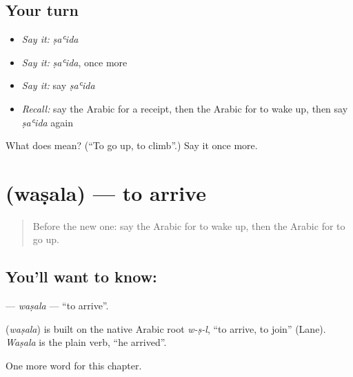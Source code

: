 \subsection*{Your turn}
\begin{itemize}
\raggedright
  \item \emph{Say it:} \emph{ṣaʿida}
  \item \emph{Say it:} \emph{ṣaʿida}, once more
  \item \emph{Say it:} say \emph{ṣaʿida}
  \item \emph{Recall:} say the Arabic for a receipt, then the Arabic for to wake up, then say \emph{ṣaʿida} again
\end{itemize}

\begin{tcolorbox}[breakable,colback=teal!4,colframe=teal!35!black,title={Before you move on}]
What does  mean? (\textquotedblleft{}To go up, to climb\textquotedblright{}.) Say it once more.
\end{tcolorbox}
\section[\texorpdfstring{\ar{وصل} (waṣala)}{وصل (waṣala)}]{ (waṣala) — to arrive}

\label{lesson:AR-C159-wasala}



\begin{quote}
Before the new one: say the Arabic for to wake up, then the Arabic for to go up.
\end{quote}

\subsection*{You'll want to know: }
\textbf{} — \emph{waṣala} — \textquotedblleft{}to arrive\textquotedblright{}.

\begin{cousinweb}
\textbf{} (\emph{waṣala}) is built on the native Arabic root \emph{w-ṣ-l}, \textquotedblleft{}to arrive, to join\textquotedblright{} (Lane). \emph{Waṣala} is the plain verb, \textquotedblleft{}he arrived\textquotedblright{}.
\end{cousinweb}

\begin{grammarlens}[title={What you've built}]
One more word for this chapter.
\end{grammarlens}

